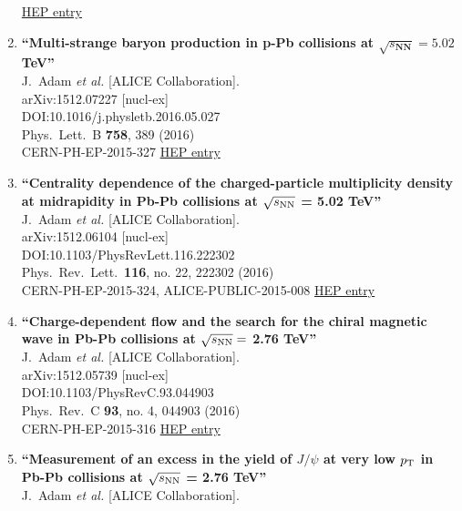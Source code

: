 \begin{enumerate}
\href{http://inspirehep.net/record/1411653}{HEP entry}
\item%
{\bf ``Multi-strange baryon production in p-Pb collisions at $\sqrt{s_\mathbf{NN}}=5.02$ TeV''}
  \\{}J.~Adam {\it et al.} [ALICE Collaboration].
  \\{}arXiv:1512.07227 [nucl-ex]
  \\{}DOI:10.1016/j.physletb.2016.05.027
  \\{}Phys.\ Lett.\ B {\bf 758}, 389 (2016)
  \\{}CERN-PH-EP-2015-327
\href{http://inspirehep.net/record/1411084}{HEP entry}
\item%
{\bf ``Centrality dependence of the charged-particle multiplicity density at midrapidity in Pb-Pb collisions at $\sqrt{s_{\rm NN}}$ = 5.02 TeV''}
  \\{}J.~Adam {\it et al.} [ALICE Collaboration].
  \\{}arXiv:1512.06104 [nucl-ex]
  \\{}DOI:10.1103/PhysRevLett.116.222302
  \\{}Phys.\ Rev.\ Lett.\  {\bf 116}, no. 22, 222302 (2016)
  \\{}CERN-PH-EP-2015-324, ALICE-PUBLIC-2015-008
\href{http://inspirehep.net/record/1410589}{HEP entry}
\item%
{\bf ``Charge-dependent flow and the search for the chiral magnetic wave in Pb-Pb collisions at $\sqrt{s_{\rm NN}} =$ 2.76 TeV''}
  \\{}J.~Adam {\it et al.} [ALICE Collaboration].
  \\{}arXiv:1512.05739 [nucl-ex]
  \\{}DOI:10.1103/PhysRevC.93.044903
  \\{}Phys.\ Rev.\ C {\bf 93}, no. 4, 044903 (2016)
  \\{}CERN-PH-EP-2015-316
\href{http://inspirehep.net/record/1410144}{HEP entry}
\item%
{\bf ``Measurement of an excess in the yield of $J/\psi$ at very low $p_{\rm T}$ in Pb-Pb collisions at $\sqrt{s_{\rm NN}}$ = 2.76 TeV''}
  \\{}J.~Adam {\it et al.} [ALICE Collaboration].

\end{enumerate}

